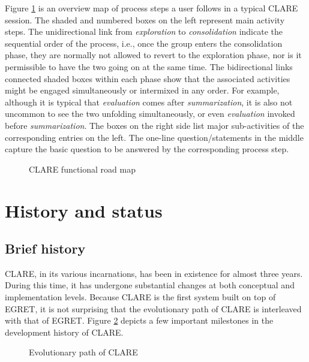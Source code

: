 Figure \ref{fig:roadmap} is an overview map of process steps a user follows
in a typical CLARE session. The shaded and numbered boxes on the left
represent main activity steps. The unidirectional link from {\it exploration\/}
to {\it consolidation\/} indicate the sequential order of the process, i.e.,
once the group enters the consolidation phase, they are normally not
allowed to revert to the exploration phase, nor is it permissible to have
the two going on at the same time.  The bidirectional links connected
shaded boxes within each phase show that the associated activities might be
engaged simultaneously or intermixed in any order. For example, although it
is typical that {\it evaluation\/} comes after {\it summarization\/}, it is
also not uncommon to see the two unfolding simultaneously, or even {\em
evaluation\/} invoked before {\it summarization\/}. The boxes on the right
side list major sub-activities of the corresponding entries on the
left. The one-line question/statements in the middle capture the basic
question to be answered by the corresponding process step.

\begin{figure}
  \caption{CLARE functional road map}
  \label{fig:roadmap}
\end{figure}


\section{History and status}
\label{sec:c4-history}

\subsection{Brief history}
\label{sec:history1}

CLARE, in its various incarnations, has been in existence for almost three
years. During this time, it has undergone substantial changes at both
conceptual and implementation levels.  Because CLARE is the first system
built on top of EGRET, it is not surprising that the evolutionary path of
CLARE is interleaved with that of EGRET. Figure \ref{fig:history} depicts a
few important milestones in the development history of CLARE.

\begin{figure}
  \caption{Evolutionary path of CLARE}
  \label{fig:history}
\end{figure}


